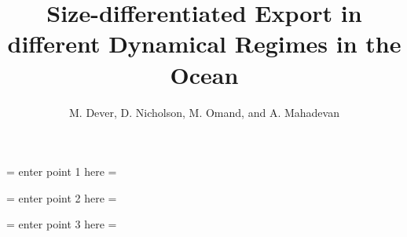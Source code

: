 \documentclass[draft,linenumbers]{agujournal2018}
\begin{document}
%
%
\title{Size-differentiated Export in different Dynamical Regimes in the Ocean}

%
%
\author{M. Dever, D. Nicholson, M. Omand, and A. Mahadevan}

%
%

\begin{keypoints}
\item = enter point 1 here =
\item = enter point 2 here =
\item = enter point 3 here =
\end{keypoints}
\end{document}
